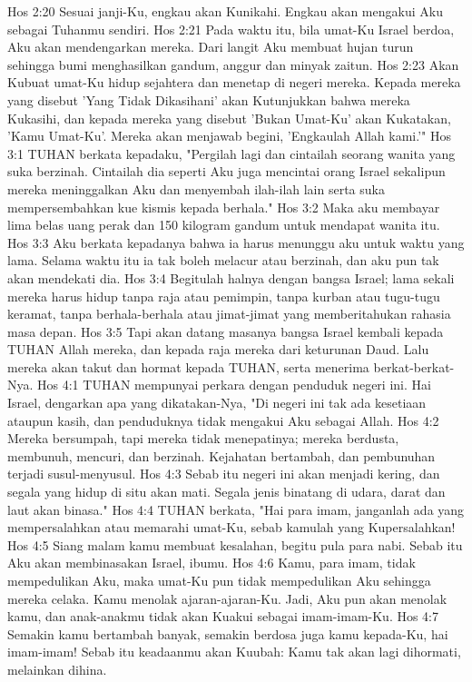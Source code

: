 Hos 2:20  Sesuai janji-Ku, engkau akan Kunikahi. Engkau akan mengakui Aku sebagai Tuhanmu sendiri.
Hos 2:21  Pada waktu itu, bila umat-Ku Israel berdoa, Aku akan mendengarkan mereka. Dari langit Aku membuat hujan turun sehingga bumi menghasilkan gandum, anggur dan minyak zaitun.
Hos 2:23  Akan Kubuat umat-Ku hidup sejahtera dan menetap di negeri mereka. Kepada mereka yang disebut 'Yang Tidak Dikasihani' akan Kutunjukkan bahwa mereka Kukasihi, dan kepada mereka yang disebut 'Bukan Umat-Ku' akan Kukatakan, 'Kamu Umat-Ku'. Mereka akan menjawab begini, 'Engkaulah Allah kami.'"
Hos 3:1  TUHAN berkata kepadaku, "Pergilah lagi dan cintailah seorang wanita yang suka berzinah. Cintailah dia seperti Aku juga mencintai orang Israel sekalipun mereka meninggalkan Aku dan menyembah ilah-ilah lain serta suka mempersembahkan kue kismis kepada berhala."
Hos 3:2  Maka aku membayar lima belas uang perak dan 150 kilogram gandum untuk mendapat wanita itu.
Hos 3:3  Aku berkata kepadanya bahwa ia harus menunggu aku untuk waktu yang lama. Selama waktu itu ia tak boleh melacur atau berzinah, dan aku pun tak akan mendekati dia.
Hos 3:4  Begitulah halnya dengan bangsa Israel; lama sekali mereka harus hidup tanpa raja atau pemimpin, tanpa kurban atau tugu-tugu keramat, tanpa berhala-berhala atau jimat-jimat yang memberitahukan rahasia masa depan.
Hos 3:5  Tapi akan datang masanya bangsa Israel kembali kepada TUHAN Allah mereka, dan kepada raja mereka dari keturunan Daud. Lalu mereka akan takut dan hormat kepada TUHAN, serta menerima berkat-berkat-Nya.
Hos 4:1  TUHAN mempunyai perkara dengan penduduk negeri ini. Hai Israel, dengarkan apa yang dikatakan-Nya, "Di negeri ini tak ada kesetiaan ataupun kasih, dan penduduknya tidak mengakui Aku sebagai Allah.
Hos 4:2  Mereka bersumpah, tapi mereka tidak menepatinya; mereka berdusta, membunuh, mencuri, dan berzinah. Kejahatan bertambah, dan pembunuhan terjadi susul-menyusul.
Hos 4:3  Sebab itu negeri ini akan menjadi kering, dan segala yang hidup di situ akan mati. Segala jenis binatang di udara, darat dan laut akan binasa."
Hos 4:4  TUHAN berkata, "Hai para imam, janganlah ada yang mempersalahkan atau memarahi umat-Ku, sebab kamulah yang Kupersalahkan!
Hos 4:5  Siang malam kamu membuat kesalahan, begitu pula para nabi. Sebab itu Aku akan membinasakan Israel, ibumu.
Hos 4:6  Kamu, para imam, tidak mempedulikan Aku, maka umat-Ku pun tidak mempedulikan Aku sehingga mereka celaka. Kamu menolak ajaran-ajaran-Ku. Jadi, Aku pun akan menolak kamu, dan anak-anakmu tidak akan Kuakui sebagai imam-imam-Ku.
Hos 4:7  Semakin kamu bertambah banyak, semakin berdosa juga kamu kepada-Ku, hai imam-imam! Sebab itu keadaanmu akan Kuubah: Kamu tak akan lagi dihormati, melainkan dihina.
